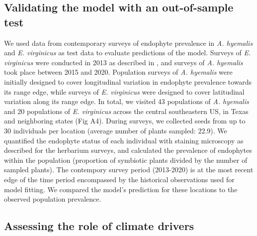 \documentclass[11pt]{article}
\begin{document}
\subsection*{Validating the model with an out-of-sample test}
We used data from contemporary surveys of endophyte prevalence  in \emph{A. hyemalis} and \emph{E. virginicus} as test data to evaluate predictions of the model. 
Surveys of \emph{E. virginicus} were conducted in 2013 as described in \citet{sneck2017variation}, and surveys of \emph{A. hyemalis} took place between 2015 and 2020.
Population surveys of \emph{A. hyemalis} were initially designed to cover longitudinal variation in endophyte prevalence towards its range edge, while surveys of \emph{E. virginicus} were designed to cover latitudinal variation along its range edge. 
In total, we visited 43 populations of \emph{A. hyemalis} and 20 populations of \emph{E. virginicus} across the central southeastern US, in Texas and neighboring states (Fig A4).
During surveys, we collected seeds from up to 30 individuals per location  (average number of plants sampled: 22.9).
We quantified the endophyte status of each individual with staining microscopy as described for the herbarium surveys, and calculated the prevalence of endophytes within the population (proportion of symbiotic plants divided by the number of sampled plants).
The contempory survey period (2013-2020) is at the most recent edge of the time period encompassed by the historical observations used for model fitting.
We compared the model's prediction for these locations to the observed population prevalence.

		\subsection*{Assessing the role of climate drivers}
		
\end{document}
